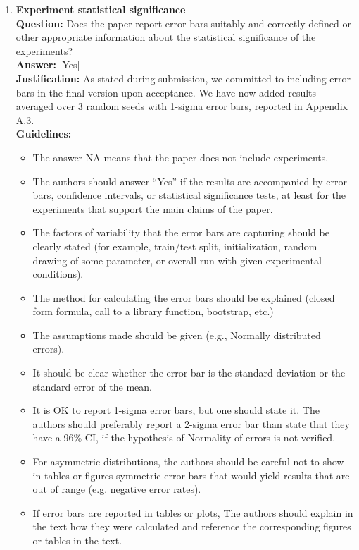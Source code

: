 \begin{enumerate}
\item \textbf{Experiment statistical significance}\\
\textbf{Question:} Does the paper report error bars suitably and correctly defined or other appropriate information about the statistical significance of the experiments?\\
\textbf{Answer:} [Yes]\\
\textbf{Justification:} As stated during submission, we committed to including error bars in the final version upon acceptance. We have now added results averaged over 3 random seeds with 1-sigma error bars, reported in Appendix A.3.\\
\textbf{Guidelines:}
\begin{itemize}
\item The answer NA means that the paper does not include experiments.
\item The authors should answer ``Yes'' if the results are accompanied by error bars, confidence intervals, or statistical significance tests, at least for the experiments that support the main claims of the paper.
\item The factors of variability that the error bars are capturing should be clearly stated (for example, train/test split, initialization, random drawing of some parameter, or overall run with given experimental conditions).
\item The method for calculating the error bars should be explained (closed form formula, call to a library function, bootstrap, etc.)
\item The assumptions made should be given (e.g., Normally distributed errors).
\item It should be clear whether the error bar is the standard deviation or the standard error of the mean.
\item It is OK to report 1-sigma error bars, but one should state it. The authors should preferably report a 2-sigma error bar than state that they have a 96\% CI, if the hypothesis of Normality of errors is not verified.
\item For asymmetric distributions, the authors should be careful not to show in tables or figures symmetric error bars that would yield results that are out of range (e.g. negative error rates).
\item If error bars are reported in tables or plots, The authors should explain in the text how they were calculated and reference the corresponding figures or tables in the text.
\end{itemize}


\end{enumerate}
